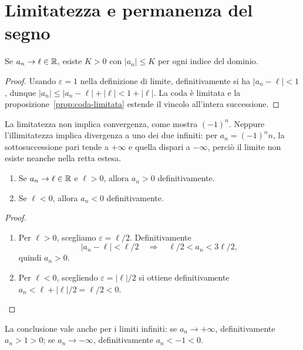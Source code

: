 \section{Limitatezza e permanenza del segno}

\begin{teorema}
Se $a_n\to\ell\in\mathbb{R}$, esiste $K>0$ con $|a_n|\le K$ per ogni indice del dominio.
\end{teorema}
\begin{proof}
Usando $\varepsilon=1$ nella definizione di limite, definitivamente si ha $|a_n-\ell|<1$, dunque $|a_n|\le|a_n-\ell|+|\ell|<1+|\ell|$. La coda è limitata e la proposizione~\ref{prop:coda-limitata} estende il vincolo all'intera successione.
\end{proof}

\begin{osservazione}
La limitatezza non implica convergenza, come mostra $(-1)^n$. Neppure l'illimitatezza implica divergenza a uno dei due infiniti: per $a_n=(-1)^n n$, la sottosuccessione pari tende a $+\infty$ e quella dispari a $-\infty$, perciò il limite non esiste neanche nella retta estesa.
\end{osservazione}

\begin{teorema}
\label{teo:permanenza-segno}
\begin{enumerate}[label=\arabic*.]
\item Se $a_n\to\ell\in\mathbb{R}$ e $\ell>0$, allora $a_n>0$ definitivamente.
\item Se $\ell<0$, allora $a_n<0$ definitivamente.
\end{enumerate}
\end{teorema}
\begin{proof}
\begin{enumerate}[label=\arabic*.]
\item Per $\ell>0$, scegliamo $\varepsilon=\ell/2$. Definitivamente
\[
|a_n-\ell|<\ell/2
\quad\Longrightarrow\quad \ell/2<a_n<3\ell/2,
\]
quindi $a_n>0$.
\item Per $\ell<0$, scegliendo $\varepsilon=|\ell|/2$ si ottiene definitivamente $a_n<\ell+|\ell|/2=\ell/2<0$.
\end{enumerate}
\end{proof}

La conclusione vale anche per i limiti infiniti: se $a_n\to+\infty$, definitivamente $a_n>1>0$; se $a_n\to-\infty$, definitivamente $a_n<-1<0$.

